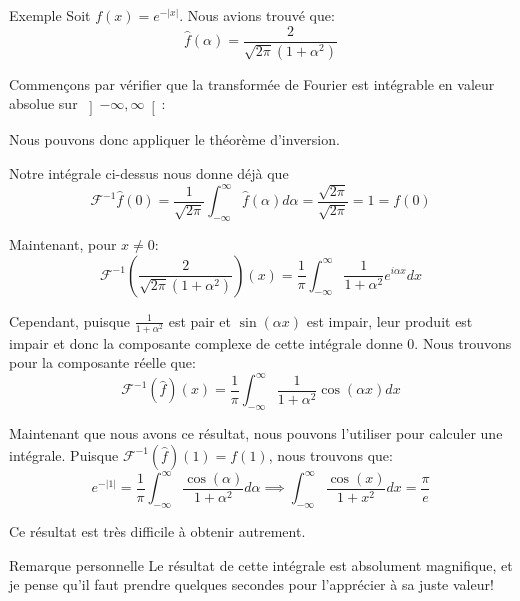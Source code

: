 \documentclass[a4paper]{article}
\begin{document}
\begin{parag}{Exemple}
    Soit $f\left(x\right) = e^{-\left|x\right|}$. Nous avions trouvé que: 
    \[\hat{f}\left(\alpha\right) = \frac{2}{\sqrt{2\pi} \left(1 + \alpha ^2\right)}\]
    
    Commençons par vérifier que la transformée de Fourier est intégrable en valeur absolue sur $\left]-\infty, \infty\right[ $: 
    
    Nous pouvons donc appliquer le théorème d'inversion. 

    Notre intégrale ci-dessus nous donne déjà que 
    \[\mathcal{F}^{-1} \hat{f}\left(0\right) = \frac{1}{\sqrt{2\pi}} \int_{-\infty}^{\infty} \hat{f}\left(\alpha\right) d \alpha = \frac{\sqrt{2\pi}}{\sqrt{2\pi}} = 1 = f\left(0\right)\]

    Maintenant, pour $x \neq 0$: 
    \[\mathcal{F}^{-1} \left(\frac{2}{\sqrt{2\pi} \left(1 + \alpha ^2\right)}\right)\left(x\right) = \frac{1}{\pi} \int_{-\infty}^{\infty} \frac{1}{1 + \alpha ^2}  e^{i \alpha x} dx\]
    
    Cependant, puisque $\frac{1}{1 + \alpha ^2}$ est pair et $\sin\left(\alpha x\right)$ est impair, leur produit est impair et donc la composante complexe de cette intégrale donne 0. Nous trouvons pour la composante réelle que: 
    \[\mathcal{F}^{-1} \left(\hat{f}\right)\left(x\right) = \frac{1}{\pi} \int_{-\infty}^{\infty} \frac{1}{1 + \alpha ^2} \cos\left(\alpha x\right) dx\]
    
    Maintenant que nous avons ce résultat, nous pouvons l'utiliser pour calculer une intégrale. Puisque $\mathcal{F}^{-1}\left(\hat{f}\right)\left(1\right) = f\left(1\right)$, nous trouvons que: 
    \[e^{-\left|1\right|} = \frac{1}{\pi} \int_{-\infty}^{\infty} \frac{\cos\left(\alpha\right)}{1 + \alpha ^2} d \alpha \implies \int_{-\infty}^{\infty} \frac{\cos\left(x\right)}{1 + x^2} dx = \frac{\pi}{e}\]

    Ce résultat est très difficile à obtenir autrement.

    \begin{subparag}{Remarque personnelle}
        Le résultat de cette intégrale est absolument magnifique, et je pense qu'il faut prendre quelques secondes pour l'apprécier à sa juste valeur!
    \end{subparag}
    
\end{parag}
\end{document}
